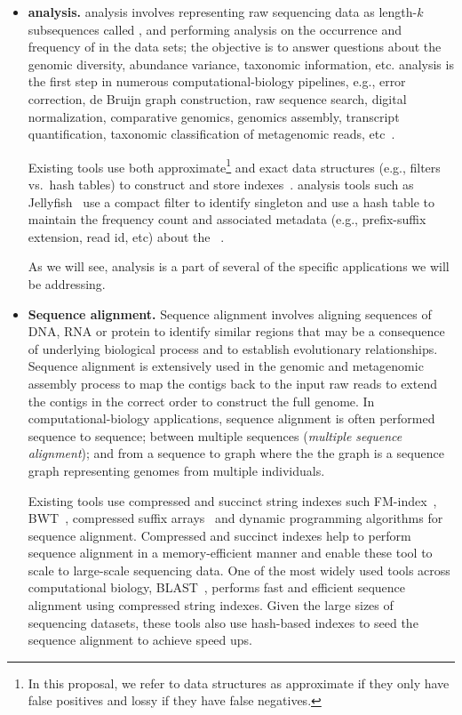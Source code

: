\begin{itemize}[leftmargin=*]

\item {\bf \Kmer analysis.}
\Kmer analysis involves representing raw sequencing data as length-$k$ subsequences called \kmers, and performing analysis on the occurrence and frequency of \kmers in the data sets; the objective is to answer questions about the genomic diversity, abundance variance, taxonomic information, etc. \Kmer analysis is the first step in numerous computational-biology pipelines, e.g., error correction, de Bruijn graph construction, raw sequence search, digital normalization, comparative genomics, genomics assembly, transcript quantification, taxonomic classification of metagenomic reads, etc~\cite{xxxx}.

Existing tools use both  approximate\footnote{In this proposal, we refer to data structures as approximate if they only have false positives and lossy if they have false negatives.} and exact data structures (e.g., filters vs.\ hash tables) to construct and store \kmer indexes~\cite{MarccaisKi11,PandeyBJP17a}.  \kmer analysis tools such as  Jellyfish~\cite{MarccaisKi11} use a compact filter to identify singleton \kmers and use a hash table to maintain the frequency count and associated metadata (e.g., prefix-suffix extension, read id, etc) about the \kmers~\cite{HofmeyrEGC20}.

As we will see, \kmer analysis is a part of several of the specific applications we will be addressing.


\item {\bf Sequence alignment.} Sequence alignment involves aligning sequences of DNA, RNA or protein to identify similar regions that may be a consequence of underlying biological process and to establish evolutionary relationships.
Sequence alignment is extensively used in the genomic and metagenomic assembly process to map the contigs back to the input raw reads to extend the contigs in the correct order to construct the full genome. In computational-biology applications, sequence alignment is often performed sequence to sequence; between multiple sequences (\emph{multiple sequence alignment}); and from a sequence to graph where the the graph is a sequence graph representing genomes from multiple individuals.

Existing tools use compressed and succinct string indexes such FM-index~\cite{ferragina2000opportunistic}, BWT~\cite{burrows1994block}, compressed suffix arrays~\cite{grossi2000compressed} and dynamic programming algorithms for sequence alignment.
Compressed and succinct indexes help to perform sequence alignment in a memory-efficient manner and enable these tool to scale to large-scale sequencing data.
One of the most widely used tools across computational biology, BLAST~\cite{altschul1990basic}, performs fast and efficient sequence alignment using compressed string indexes.
Given the large sizes of sequencing datasets, these tools also use hash-based \kmer indexes to seed the sequence alignment to achieve speed ups.



\end{itemize}
